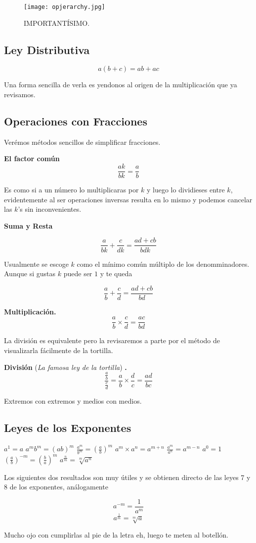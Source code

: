 \begin{figure}
    \centering
    \texttt{[image: opjerarchy.jpg]}
    \caption{IMPORTANTÍSIMO.}
\end{figure}

\subsection{Ley Distributiva}

\[a(b+c) = ab+ac\]

Una forma sencilla de verla es yendonos al origen de la 
multiplicación que ya revisamos.

\subsection{Operaciones con Fracciones}

Verémos métodos sencillos de simplificar fracciones.

\textbf{El factor común}
\[\frac{ak}{bk} = \frac{a}{b}\]

Es como si a un número lo multiplicaras por $k$ y luego lo 
dividieses entre $k$, evidentemente al ser operaciones inversas 
resulta en lo mismo y podemos cancelar las $k$'s sin inconvenientes.

\textbf{Suma y Resta}

\[\frac{a}{bk}+\frac{c}{dk} = \frac{ad+cb}{bdk}\]

Usualmente se escoge $k$ como el mínimo común múltiplo de los 
denomminadores. Aunque si gustas $k$ puede ser $1$ y te queda

\[\frac{a}{b}+\frac{c}{d} = \frac{ad+cb}{bd}\]

\textbf{Multiplicación.}
\[\frac{a}{b} \times \frac{c}{d} = \frac{ac}{bd}\]

La división es equivalente pero la revisaremos a parte por 
el método de visualizarla fácilmente de la tortilla.

\textbf{División} (\textit{La famosa ley de la tortilla}) \textbf{.}
\[\frac{\frac{a}{b}}{\frac{c}{d}} = \frac{a}{b} 
\times \frac{d}{c} = \frac{ad}{bc}\]

Extremos con extremos y medios con medios.

\subsection{Leyes de los Exponentes}

\begin{enumerate}
    \ii $a^1 = a$
    \ii $a^mb^m = (ab)^m$
    \ii $\frac{a^m}{b^m} = \left(\frac{a}{b}\right)^{m}$
    \ii $a^m \times a^n = a^{m+n}$
    \ii $\frac{a^m}{a^n} = a^{m-n}$
    \ii $a^0 = 1$
    \ii $\left(\frac{a}{b}\right)^{-m} = \left(\frac{b}{a}\right)^{m}$
    \ii $a^{\frac{n}{m}} = \sqrt[m]{a^n}$   
\end{enumerate}

Los siguientes dos resultados son muy útiles y se obtienen 
directo de las leyes 7 y 8 de los exponentes, análogamente

\[a^{-m} = \frac{1}{a^m}\]
\[a^{\frac{1}{m}} = \sqrt[m]{a}\]

Mucho ojo con cumplirlas al pie de la letra eh, luego te meten 
al botellón.
